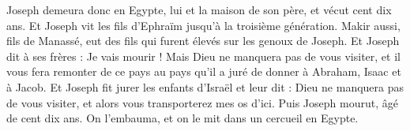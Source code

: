 \begin{multicols}{2}
Joseph demeura donc en Egypte, lui et la maison de son père, et vécut cent dix ans.
Et Joseph vit les fils d'Ephraïm jusqu'à la troisième génération. Makir aussi, fils de Manassé, eut des fils qui furent élevés sur les genoux de Joseph.
Et Joseph dit à ses frères : Je vais mourir ! Mais Dieu ne manquera pas de vous visiter, et il vous fera remonter de ce pays au pays qu’il a juré  de donner à Abraham, Isaac et à Jacob.
Et Joseph fit jurer les enfants d'Israël et leur dit : Dieu ne manquera pas de vous visiter, et alors vous transporterez mes os d'ici.
Puis Joseph mourut, âgé de cent dix ans. On l'embauma, et on le mit dans un cercueil en Egypte.
\PPE{}
\end{multicols}
